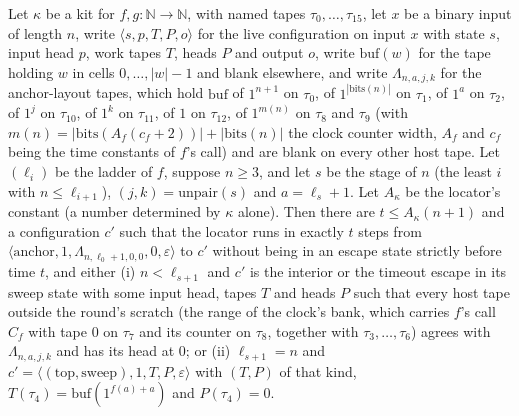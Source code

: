 \begin{theorem}
\label{Turing.NTimeDiag.qy_loop}
\leanok
{}
Let $\kappa$ be a kit for $f, g : \mathbb{N} \to \mathbb{N}$, with named tapes $\tau_0, \dots,
\tau_{15}$, let $x$ be a binary input of length $n$, write $\langle s, p, T, P, o\rangle$ for the
live configuration on input $x$ with state $s$, input head $p$, work tapes $T$, heads $P$ and
output $o$, write $\mathrm{buf}(w)$ for the tape holding $w$ in cells $0, \dots, |w| - 1$ and blank
elsewhere, and write $\Lambda_{n,a,j,k}$ for the anchor-layout tapes, which hold $\mathrm{buf}$ of
$1^{n+1}$ on $\tau_0$, of $1^{|\mathrm{bits}(n)|}$ on $\tau_1$, of $1^a$ on $\tau_2$, of $1^j$ on
$\tau_{10}$, of $1^k$ on $\tau_{11}$, of $1$ on $\tau_{12}$, of $1^{m(n)}$ on $\tau_8$ and $\tau_9$
(with $m(n) = |\mathrm{bits}(A_f(c_f + 2))| + |\mathrm{bits}(n)|$ the clock counter width, $A_f$
and $c_f$ being the time constants of $f$'s call) and are blank on every other host tape. Let
$(\ell_i)$ be the ladder of $f$, suppose $n \ge 3$, and let $s$ be the stage of $n$ (the least $i$
with $n \le \ell_{i+1}$), $(j, k) = \mathrm{unpair}(s)$ and $a = \ell_s + 1$. Let $A_\kappa$ be the
locator's constant (a number determined by $\kappa$ alone). Then there are $t \le A_\kappa (n + 1)$
and a configuration $c'$ such that the locator runs in exactly $t$ steps from $\langle
\mathrm{anchor}, 1, \Lambda_{n,\ell_0 + 1,0,0}, 0, \varepsilon\rangle$ to $c'$ without being in an
escape state strictly before time $t$, and either (i) $n < \ell_{s+1}$ and $c'$ is the interior or
the timeout escape in its sweep state with some input head, tapes $T$ and heads $P$ such that every
host tape outside the round's scratch (the range of the clock's bank, which carries $f$'s call
$C_f$ with tape $0$ on $\tau_7$ and its counter on $\tau_8$, together with $\tau_3, \dots, \tau_6$)
agrees with $\Lambda_{n,a,j,k}$ and has its head at $0$; or (ii) $\ell_{s+1} = n$ and $c' = \langle
(\mathrm{top}, \mathrm{sweep}), 1, T, P, \varepsilon\rangle$ with $(T, P)$ of that kind, $T(\tau_4)
= \mathrm{buf}(1^{f(a) + a})$ and $P(\tau_4) = 0$.
\end{theorem}

